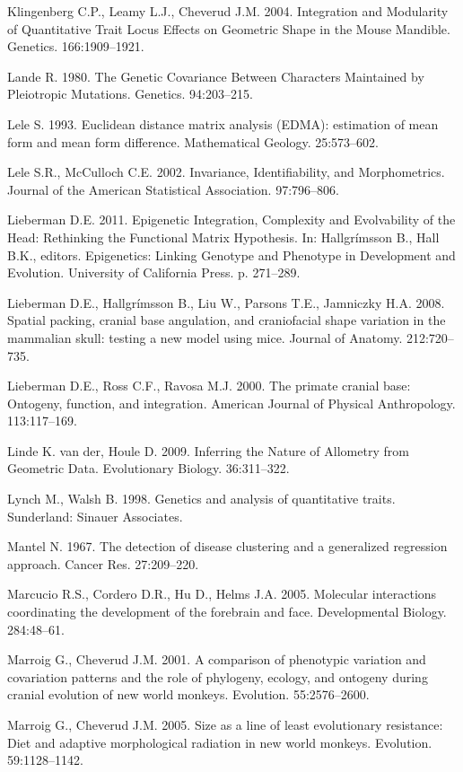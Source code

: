 \documentclass[12pt,]{article}
\begin{document}
Klingenberg C.P., Leamy L.J., Cheverud J.M. 2004. Integration and
Modularity of Quantitative Trait Locus Effects on Geometric Shape in the
Mouse Mandible. Genetics. 166:1909--1921.

Lande R. 1980. The Genetic Covariance Between Characters Maintained by
Pleiotropic Mutations. Genetics. 94:203--215.

Lele S. 1993. Euclidean distance matrix analysis (EDMA): estimation of
mean form and mean form difference. Mathematical Geology. 25:573--602.

Lele S.R., McCulloch C.E. 2002. Invariance, Identifiability, and
Morphometrics. Journal of the American Statistical Association.
97:796--806.

Lieberman D.E. 2011. Epigenetic Integration, Complexity and Evolvability
of the Head: Rethinking the Functional Matrix Hypothesis. In:
Hallgrímsson B., Hall B.K., editors. Epigenetics: Linking Genotype and
Phenotype in Development and Evolution. University of California Press.
p. 271--289.

Lieberman D.E., Hallgrímsson B., Liu W., Parsons T.E., Jamniczky H.A.
2008. Spatial packing, cranial base angulation, and craniofacial shape
variation in the mammalian skull: testing a new model using mice.
Journal of Anatomy. 212:720--735.

Lieberman D.E., Ross C.F., Ravosa M.J. 2000. The primate cranial base:
Ontogeny, function, and integration. American Journal of Physical
Anthropology. 113:117--169.

Linde K. van der, Houle D. 2009. Inferring the Nature of Allometry from
Geometric Data. Evolutionary Biology. 36:311--322.

Lynch M., Walsh B. 1998. Genetics and analysis of quantitative traits.
Sunderland: Sinauer Associates.

Mantel N. 1967. The detection of disease clustering and a generalized
regression approach. Cancer Res. 27:209--220.

Marcucio R.S., Cordero D.R., Hu D., Helms J.A. 2005. Molecular
interactions coordinating the development of the forebrain and face.
Developmental Biology. 284:48--61.

Marroig G., Cheverud J.M. 2001. A comparison of phenotypic variation and
covariation patterns and the role of phylogeny, ecology, and ontogeny
during cranial evolution of new world monkeys. Evolution. 55:2576--2600.

Marroig G., Cheverud J.M. 2005. Size as a line of least evolutionary
resistance: Diet and adaptive morphological radiation in new world
monkeys. Evolution. 59:1128--1142.
\end{document}
